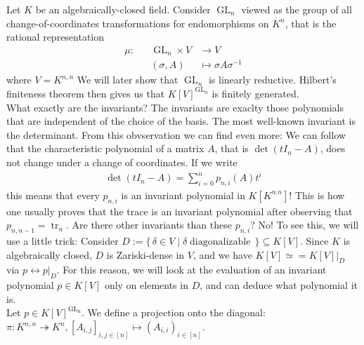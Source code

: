 \begin{dexample}
  Let $K$ be an algebraically-closed field.
  Consider $\operatorname{GL}_n$ viewed as the group of all change-of-coordinates transformations for endomorphisms on $K^n$, that is the rational representation
  \begin{equation}
    \begin{aligned}
      \mu \colon && \operatorname{GL}_n \times V  & \longrightarrow V \\
      && (\sigma,A) &\longmapsto \sigma A \sigma^{-1}
    \end{aligned}
  \end{equation}
  where $V = K^{n,n}$
  We will later show that $\operatorname{GL}_n$ is linearly reductive.
  Hilbert's finiteness theorem then gives us that $K[V]^{\operatorname{GL}_n}$ is finitely generated.\\
  What exactly are the invariants?
  The invariants are exaclty those polynomials that are independent of the choice of the basis.
  The most well-known invariant is the determinant.
  From this obvservation we can find even more:
  We can follow that the characteristic polynomial of a matrix $A$, that is $\operatorname{det} (tI_n - A)$, does not change under a change of coordinates.
  If we write
  \begin{equation}
    \begin{aligned}
      \operatorname{det} (tI_n - A) = \sum_{i=0}^n p_{n,i} (A) t^i
    \end{aligned}
  \end{equation}
  this means that every $p_{n,i}$ is an invariant polynomial in $K[K^{n.n}]$!
  This is how one usually proves that the trace is an invariant polynomial after observing that $p_{n,n-1} = \operatorname{tr}_n$.
  Are there other invariants than these $p_{n,i}$?
  No!
  To see this, we will use a little trick:
  Consider $D := \{\, \delta \in V \mid \delta \operatorname{diagonalizable} \,\} \subseteq K[V]$.
  Since $K$ is algebraically closed, $D$ is Zariski-dense in $V$, and we have $K[V] \simeq = \left. K[V] \right|_{D}$ via $p \leftrightarrow \left. p \right|_{D}$.
  For this reason, we will look at the evaluation of an invariant polynomial $p \in K[V] $ only on elements in $D$, and can deduce what polynomial it is.\\
  Let $p \in K[V]^{\operatorname{GL_n}}$.
  We define a projection onto the diagonal:
  $\pi \colon K^{n,n} \twoheadrightarrow K^n , [A_{i,j}]_{i,j \in [n]} \longmapsto (A_{i,i})_{i \in [n]} $.

\end{dexample}
